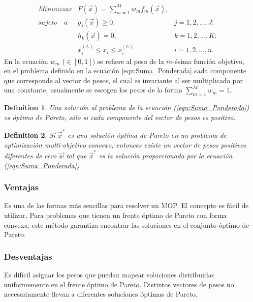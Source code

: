 \begin{equation} \label{eqn:Suma_Ponderada}
\begin{matrix}
Minimizar         & F(\vec{x})= \sum_{m=1}^M w_m f_m(\vec{x}), &  \\
sujeto\quad a & g_j(\vec{x}) \geq 0,                          & j=1, 2, ..., J;\\
                 & h_k(\vec{x}) = 0,                             & k=1,2, ..., K; \\
                 & x_i^{(L)} \leq x_i \leq x_i^{(U)}                & i=1, 2, ..., n.
\end{matrix}
\end{equation}
En la ecuación $w_m$ ($\in [0,1]$) se refiere al peso de la $m$-ésima función objetivo, en el problema definido en la ecuación \ref{eqn:Suma_Ponderada}  cada componente que corresponde al vector de pesos, el cual es invariante al ser multiplicado por una constante, usualmente se escogen los pesos de la forma
$\sum_{m=1}^M w_m = 1$.
\newtheorem{Classic}{Definition}

\begin{Classic}
Una solución al problema de la ecuación (\ref{eqn:Suma_Ponderada}) es óptimo de Pareto, sólo si cada componente del vector de pesos es positivo.
\end{Classic}

\begin{Classic}
\textit{Si  $\vec{x}^*$ es una solución óptima de Pareto en un problema de optimización multi-objetivo convexo, entonces existe un vector de pesos positivos diferentes de cero $\vec{w}$ tal que $\vec{x}^*$ es la solución proporcionada por la ecuación (\ref{eqn:Suma_Ponderada})}
\end{Classic}
\subsubsection*{Ventajas}
Es una de las formas más sencillas para resolver un MOP. El concepto es fácil de utilizar. Para problemas que tienen un frente óptimo de Pareto con forma convexa, este método garantiza encontrar las soluciones en el conjunto óptimo de Pareto.
\subsubsection*{Desventajas}
Es difícil asignar los pesos que puedan mapear soluciones distribuidas uniformemente en el frente óptimo de Pareto.
Distintos vectores de pesos no necesariamente llevan a diferentes soluciones óptimas de Pareto.

